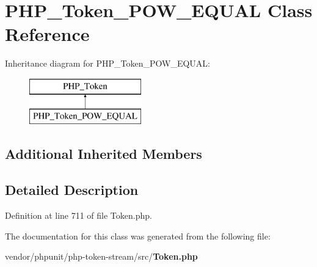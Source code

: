 \section{P\+H\+P\+\_\+\+Token\+\_\+\+P\+O\+W\+\_\+\+E\+Q\+U\+A\+L Class Reference}
\label{class_p_h_p___token___p_o_w___e_q_u_a_l}
Inheritance diagram for P\+H\+P\+\_\+\+Token\+\_\+\+P\+O\+W\+\_\+\+E\+Q\+U\+A\+L\+:\begin{figure}[H]
\begin{center}
\leavevmode
\includegraphics[height=2.000000cm]{class_p_h_p___token___p_o_w___e_q_u_a_l}
\end{center}
\end{figure}
\subsection*{Additional Inherited Members}


\subsection{Detailed Description}


Definition at line 711 of file Token.\+php.



The documentation for this class was generated from the following file\+:\begin{DoxyCompactItemize}
\item 
vendor/phpunit/php-\/token-\/stream/src/{\bf Token.\+php}\end{DoxyCompactItemize}
